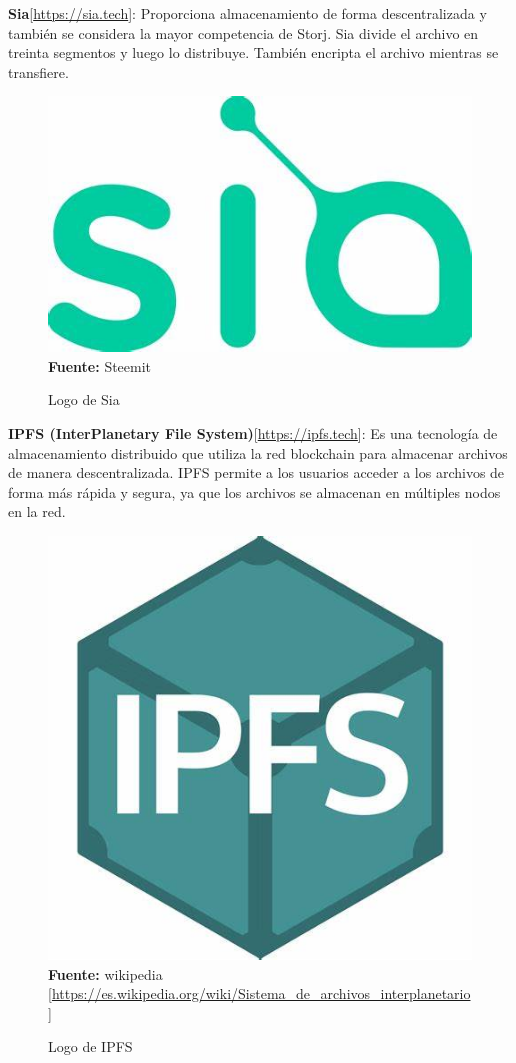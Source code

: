 \hfill \break
\textbf{Sia}[\url{https://sia.tech}]: Proporciona almacenamiento de forma descentralizada
y también se considera la mayor competencia de Storj. Sia divide el
archivo en treinta segmentos y luego lo distribuye. También encripta el archivo
mientras se transfiere.
\begin{figure}[htb!]
    \caption{Logo de Sia}
    \label{fig:sia}
    \centering
    \includegraphics[scale=0.25]{./Ilustraciones/logos/sia-logo.jpg}\\
    \textbf{Fuente:} Steemit
\end{figure}
\textbf{IPFS (InterPlanetary File System)}[\url{https://ipfs.tech}]: Es una tecnología de
almacenamiento distribuido que utiliza la red blockchain para almacenar
archivos de manera descentralizada. IPFS permite a los usuarios acceder a los
archivos de forma más rápida y segura, ya que los archivos se almacenan en
múltiples nodos en la red.
\begin{figure}[htb!]
    \caption{Logo de IPFS}
    \label{fig:ipfs}
    \centering
    \includegraphics[scale=0.25]{./Ilustraciones/logos/ipfs-logo.jpg}\\
    \textbf{Fuente:} wikipedia [\url{https://es.wikipedia.org/wiki/Sistema_de_archivos_interplanetario}]
\end{figure}
